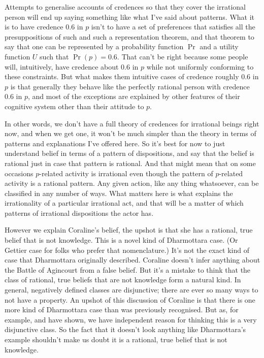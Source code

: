 \documentclass[11pt,]{book}
\begin{document}
Attempts to generalise accounts of credences so that they cover the irrational person will end up saying something like what I've said about patterns. What it is to have credence 0.6 in \(p\) isn't to have a set of preferences that satisfies all the presuppositions of such and such a representation theorem, and that theorem to say that one can be represented by a probability function \(\Pr\) and a utility function \(U\) such that \(\Pr(p) = 0.6\). That can't be right because some people will, intuitively, have credence about 0.6 in \(p\) while not uniformly conforming to these constraints. But what makes them intuitive cases of credence roughly 0.6 in \(p\) is that generally they behave like the perfectly rational person with credence 0.6 in \(p\), and most of the exceptions are explained by other features of their cognitive system other than their attitude to \(p\).

In other words, we don't have a full theory of credences for irrational beings right now, and when we get one, it won't be much simpler than the theory in terms of patterns and explanations I've offered here. So it's best for now to just understand belief in terms of a pattern of dispositions, and say that the belief is rational just in case that pattern is rational. And that might mean that on some occasions \(p\)-related activity is irrational even though the pattern of \(p\)-related activity is a rational pattern. Any given action, like any thing whatsoever, can be classified in any number of ways. What matters here is what explains the irrationality of a particular irrational act, and that will be a matter of which patterns of irrational dispositions the actor has.

However we explain Coraline's belief, the upshot is that she has a rational, true belief that is not knowledge. This is a novel kind of Dharmottara case. (Or Gettier case for folks who prefer that nomenclature.) It's not the exact kind of case that Dharmottara originally described. Coraline doesn't infer anything about the Battle of Agincourt from a false belief. But it's a mistake to think that the class of rational, true beliefs that are not knowledge form a natural kind. In general, negatively defined classes are disjunctive; there are ever so many ways to not have a property. An upshot of this discussion of Coraline is that there is one more kind of Dharmottara case than was previously recognised. But as, for example, \citet{WilliamsonLofoten} and \citet{Nagel2013-Williamson} have shown, we have independent reason for thinking this is a very disjunctive class. So the fact that it doesn't look anything like Dharmottara's example shouldn't make us doubt it is a rational, true belief that is not knowledge.
\end{document}

